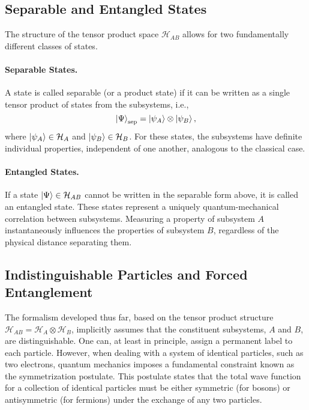 \subsection{Separable and Entangled States}
\label{sub:separable_entangled}

The structure of the tensor product space $\mathcal{H}_{AB}$ allows for two
fundamentally different classes of states.

\paragraph{Separable States.}
A state is called separable (or a product state) if it
can be written as a single tensor product of states from the subsystems,
i.e.,
\begin{equation}
	\ket{\Psi}_{\text{sep}} = \ket{\psi_A} \otimes \ket{\psi_B},
\end{equation}
where $\ket{\psi_A} \in \mathcal{H}_A$ and $\ket{\psi_B} \in \mathcal{H}_B$.
For these states, the subsystems have definite individual properties,
independent of one another, analogous to the classical case.

\paragraph{Entangled States.}
If a state $\ket{\Psi} \in \mathcal{H}_{AB}$ cannot be written in the
separable form above, it is called an entangled state. These states
represent a uniquely quantum-mechanical correlation between subsystems.
Measuring a property of subsystem $A$ instantaneously influences the
properties of subsystem $B$, regardless of the physical distance
separating them.

\subsection{Indistinguishable Particles and Forced Entanglement}
\label{sub:indistinguishable_particles}

The formalism developed thus far, based on the tensor product structure
$\mathcal{H}_{AB} = \mathcal{H}_A \otimes \mathcal{H}_B$, implicitly assumes that the
constituent subsystems, $A$ and $B$, are distinguishable. One can, at least
in principle, assign a permanent label to each particle. However, when
dealing with a system of identical particles, such as two electrons, quantum
mechanics imposes a fundamental constraint known as the symmetrization
postulate. This postulate states that the total wave function for a
collection of identical particles must be either symmetric (for bosons) or
antisymmetric (for fermions) under the exchange of any two particles.

